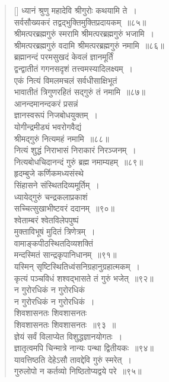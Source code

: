 \documentclass[twoside,12pt,notitlepage]{book}
\begin{document}
\begin{verse}[\versewidth]
ध्यानं श्रुणु महादेवि श्रीगुरोः कथयामि ते~।\\[-6pt]
सर्वसौख्यकरं तद्वद्भुक्तिमुक्तिप्रदायकम्~॥८५॥\\
श्रीमत्परब्रह्मगुरुं स्मरामि श्रीमत्परब्रह्मगुरुं भजामि~।\\[-6pt]
श्रीमत्परब्रह्मगुरुं वदामि श्रीमत्परब्रह्मगुरुं नमामि~॥८६॥\\
ब्रह्मानन्दं परमसुखदं केवलं ज्ञानमूर्तिं\\[-6pt]
द्वन्द्वातीतं गगनसदृशं तत्त्वमस्यादिलक्ष्यम्~।\\[-6pt]
एकं नित्यं विमलमचलं सर्वधीसाक्षिभूतं\\[-6pt]
भावातीतं त्रिगुणरहितं सद्गुरुं तं नमामि~॥८७॥\\
आनन्दमानन्दकरं प्रसन्नं\\[-6pt]
ज्ञानस्वरूपं निजबोधयुक्तम्~।\\[-6pt]
योगीन्द्रमीड्यं भवरोगवैद्यं\\[-6pt]
श्रीमद्गुरुं नित्यमहं नमामि~॥८८॥\\
नित्यं शुद्धं निराभासं निराकारं निरञ्जनम्~।\\[-6pt]
नित्यबोधचिदानन्दं गुरुं ब्रह्म नमाम्यहम्~॥८९॥\\
हृदम्बुजे कर्णिकमध्यसंस्थे\\[-6pt]
सिंहासने संस्थितदिव्यमूर्तिम्~।\\[-6pt]
ध्यायेद्गुरुं चन्द्रकलाप्रकाशं\\[-6pt]
सच्चित्सुखाभीष्टवरं ददानम्~॥९०॥\\
श्वेताम्बरं श्वेतविलेपपुष्पं\\[-6pt]
मुक्ताविभूषं मुदितं त्रिणेत्रम्~।\\[-6pt]
वामाङ्कपीठस्थितदिव्यशक्तिं\\[-6pt]
मन्दस्मितं सान्द्रकृपानिधानम्~॥९१॥\\
यस्मिन् सृष्टिस्थितिध्वंसनिग्रहानुग्रहात्मकम्~।\\[-6pt]
कृत्यं पञ्चविधं शश्वद्भासते तं गुरुं भजेत्~॥९२॥\\
न गुरोरधिकं न गुरोरधिकं\\[-6pt]
न गुरोरधिकं न गुरोरधिकं~।\\[-6pt]
शिवशासनतः शिवशासनतः\\[-6pt]
शिवशासनतः शिवशासनतः~॥९३~॥\\
ज्ञेयं सर्वं विलाप्येत विशुद्धज्ञानयोगतः~।\\[-6pt]
ज्ञातृत्वमपि चिन्मात्रे नान्यः पन्था द्वितीयकः~॥९४॥\\
यावत्तिष्ठति देहेऽसौ तावद्देवि गुरुं स्मरेत्~।\\[-6pt]
गुरुलोपो न कर्तव्यो निष्ठितोप्यद्वये परे~॥९५॥\\

\end{verse}
\end{document}
